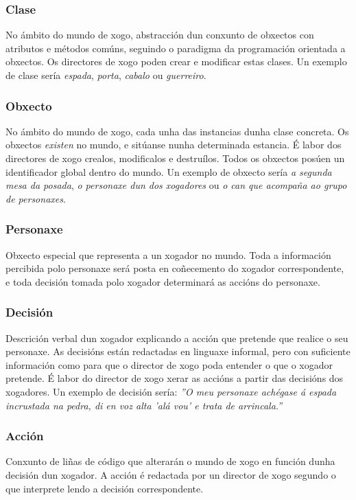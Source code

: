 \subsubsection{Clase}
No ámbito do mundo de xogo, abstracción dun conxunto de obxectos con atributos e métodos comúns, seguindo o paradigma da programación orientada a obxectos. Os directores de xogo poden crear e modificar estas clases.
Un exemplo de clase sería {\it espada}, {\it porta}, {\it cabalo} ou {\it guerreiro}.

\subsubsection{Obxecto}
No ámbito do mundo de xogo, cada unha das instancias dunha clase concreta. Os obxectos {\it existen} no mundo, e sitúanse nunha determinada estancia. É labor dos directores de xogo crealos, modificalos e destruílos. Todos os obxectos posúen un identificador global dentro do mundo.
Un exemplo de obxecto sería {\it a segunda mesa da posada}, {\it o personaxe dun dos xogadores} ou {\it o can que acompaña ao grupo de personaxes}.

\subsubsection{Personaxe}
Obxecto especial que representa a un xogador no mundo. Toda a información percibida polo personaxe será posta en coñecemento do xogador correspondente, e toda decisión tomada polo xogador determinará as accións do personaxe.

\subsubsection{Decisión}
Descrición verbal dun xogador explicando a acción que pretende que realice o seu personaxe. As decisións están redactadas en linguaxe informal, pero con suficiente información como para que o director de xogo poda entender o que o xogador pretende. É labor do director de xogo xerar as accións a partir das decisións dos xogadores.
Un exemplo de decisión sería: {\it ''O meu personaxe achégase á espada incrustada na pedra, di en voz alta 'alá vou' e trata de arrincala.''}

\subsubsection{Acción}
Conxunto de liñas de código que alterarán o mundo de xogo en función dunha decisión dun xogador. A acción é redactada por un director de xogo segundo o que interprete lendo a decisión correspondente.

